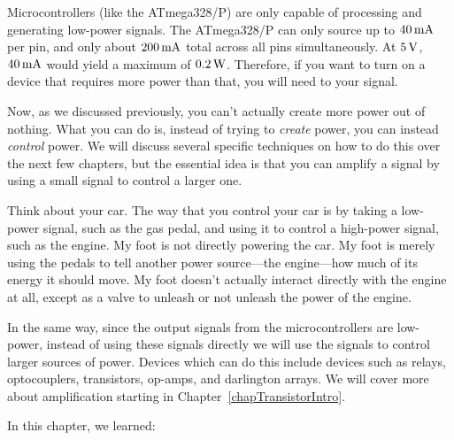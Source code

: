 Microcontrollers (like the ATmega328/P) are only capable of processing and generating low-power signals.
The ATmega328/P can only source up to $40\,\si{\milli\ampere}$ per pin, and only about $200\,\si{\milli\ampere}$ total across all pins simultaneously.
At $5\,\si{\volt}$, $40\,\si{\milli\ampere}$ would yield a maximum of $0.2\,\si{\watt}$.
Therefore, if you want to turn on a device that requires more power than that, you will need to  your signal.

Now, as we discussed previously, you can't actually create more power out of nothing.
What you can do is, instead of trying to \emph{create} power, you can instead \emph{control} power.
We will discuss several specific techniques on how to do this over the next few chapters, but the essential idea is that you can amplify a signal by using a small signal to control a larger one.

Think about your car.
The way that you control your car is by taking a low-power signal, such as the gas pedal, and using it to control a high-power signal, such as the engine.
My foot is not directly powering the car.
My foot is merely using the pedals to tell another power source---the engine---how much of its energy it should move.
My foot doesn't actually interact directly with the engine at all, except as a valve to unleash or not unleash the power of the engine.

In the same way, since the output signals from the microcontrollers are low-power, instead of using these signals directly we will use the signals to control larger sources of power.
Devices which can do this include devices such as relays, optocouplers, transistors, op-amps, and darlington arrays.
We will cover more about amplification starting in Chapter~\ref{chapTransistorIntro}.

\reviewsection

In this chapter, we learned:

